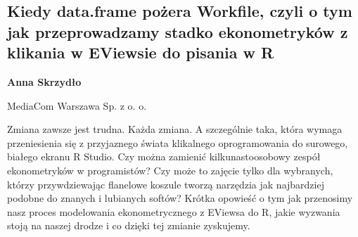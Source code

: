 \documentclass[\main/boa.tex]{subfiles}
\begin{document}
\subsection{Kiedy data.frame pożera Workfile, czyli o tym jak przeprowadzamy stadko ekonometryków z klikania w EViewsie do pisania w R}

\begin{minipage}{0.915\textwidth}
	\centering
  {\bf {}Anna Skrzydło}
\end{minipage}

\vskip 0.3cm

\begin{affiliations}
\begin{minipage}{0.915\textwidth}
\centering
MediaCom Warszawa Sp. z o. o. \\[-2pt]
\end{minipage}
\end{affiliations}

\vskip 0.8cm

Zmiana zawsze jest trudna. Każda zmiana. A szczególnie taka, która wymaga przeniesienia się z przyjaznego świata klikalnego oprogramowania do surowego, białego ekranu R Studio. Czy można zamienić kilkunastoosobowy zespół ekonometryków w programistów? Czy może to zajęcie tylko dla wybranych, którzy przywdziewając flanelowe koszule tworzą narzędzia jak najbardziej podobne do znanych i lubianych softów? Krótka opowieść o tym jak przenosimy nasz proces modelowania ekonometrycznego z EViewsa do R, jakie wyzwania stoją na naszej drodze i co dzięki tej zmianie zyskujemy. 
\end{document}
